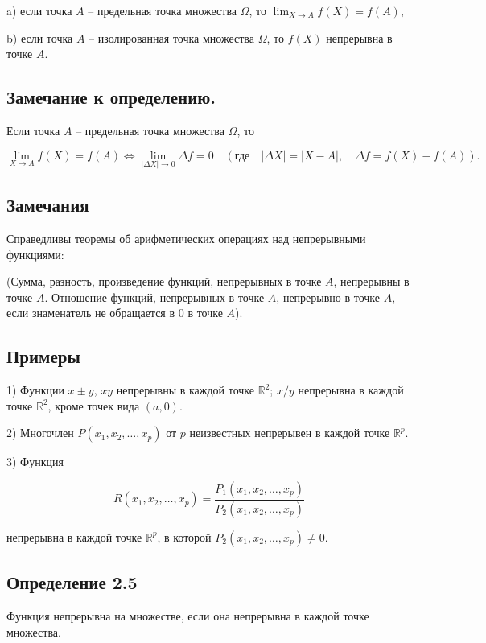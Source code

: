 {a) если точка \( A \) – предельная точка множества \( \Omega \), то \( \lim_{X \to A} f(X) = f(A), \)

b) если точка \( A \) – изолированная точка множества \( \Omega \), то \( f(X) \) непрерывна в точке \( A \).

\subsection*{Замечание к определению.}

Если точка \( A \) – предельная точка множества \( \Omega \), то


\[
\lim_{X \to A} f(X) = f(A) \iff \lim_{|\Delta X| \to 0} \Delta f = 0 \quad (\text{где} \quad |\Delta X| = |X - A|, \quad \Delta f = f(X) - f(A)).
\]

\subsection*{Замечания}

Справедливы теоремы об арифметических операциях над непрерывными функциями:

(Сумма, разность, произведение функций, непрерывных в точке \( A \), непрерывны в точке \( A \). Отношение функций, непрерывных в точке \( A \), непрерывно в точке \( A \), если знаменатель не обращается в 0 в точке \( A \)).

\subsection*{Примеры}

1) Функции \( x \pm y \), \( xy \) непрерывны в каждой точке \( \mathbb{R}^2 \); \( x/y \) непрерывна в каждой точке \( \mathbb{R}^2 \), кроме точек вида \( (a, 0) \).

2) Многочлен \( P(x_1, x_2, \dots, x_p) \) от \( p \) неизвестных непрерывен в каждой точке \( \mathbb{R}^p \).

3) Функция 

\[
R(x_1, x_2, \dots, x_p) = \frac{P_1(x_1, x_2, \dots, x_p)}{P_2(x_1, x_2, \dots, x_p)}
\]

непрерывна в каждой точке \( \mathbb{R}^p \), в которой \( P_2(x_1, x_2, \dots, x_p) \neq 0 \).

\subsection*{Определение 2.5}

Функция непрерывна на множестве, если она непрерывна в каждой точке множества.

}
